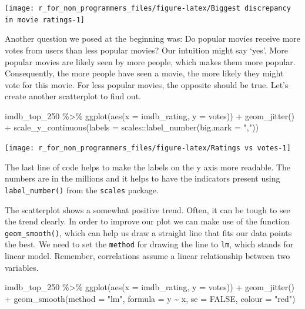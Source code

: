 \documentclass[
]{book}
\newenvironment{Shaded}{\begin{snugshade}}{\end{snugshade}}
\newcommand{\AttributeTok}[1]{\textcolor[rgb]{0.77,0.63,0.00}{#1}}
\newcommand{\ConstantTok}[1]{\textcolor[rgb]{0.00,0.00,0.00}{#1}}
\newcommand{\FunctionTok}[1]{\textcolor[rgb]{0.00,0.00,0.00}{#1}}
\newcommand{\NormalTok}[1]{#1}
\newcommand{\SpecialCharTok}[1]{\textcolor[rgb]{0.00,0.00,0.00}{#1}}
\newcommand{\StringTok}[1]{\textcolor[rgb]{0.31,0.60,0.02}{#1}}
\begin{document}
\begin{center}\texttt{[image: r\_for\_non\_programmers\_files/figure-latex/Biggest discrepancy in movie ratings-1]} \end{center}

Another question we posed at the beginning was: Do popular movies receive more votes from users than less popular movies? Our intuition might say `yes'. More popular movies are likely seen by more people, which makes them more popular. Consequently, the more people have seen a movie, the more likely they might vote for this movie. For less popular movies, the opposite should be true. Let's create another scatterplot to find out.

\begin{Shaded}
\begin{Highlighting}[]
\NormalTok{imdb\_top\_250 }\SpecialCharTok{\%\textgreater{}\%}
  \FunctionTok{ggplot}\NormalTok{(}\FunctionTok{aes}\NormalTok{(}\AttributeTok{x =}\NormalTok{ imdb\_rating, }\AttributeTok{y =}\NormalTok{ votes)) }\SpecialCharTok{+} 
  \FunctionTok{geom\_jitter}\NormalTok{() }\SpecialCharTok{+}
  \FunctionTok{scale\_y\_continuous}\NormalTok{(}\AttributeTok{labels =}\NormalTok{ scales}\SpecialCharTok{::}\FunctionTok{label\_number}\NormalTok{(}\AttributeTok{big.mark =} \StringTok{","}\NormalTok{))}
\end{Highlighting}
\end{Shaded}

\begin{center}\texttt{[image: r\_for\_non\_programmers\_files/figure-latex/Ratings vs votes-1]} \end{center}

The last line of code helps to make the labels on the y axis more readable. The numbers are in the millions and it helps to have the indicators present using \texttt{label\_number()} from the \texttt{scales} package.

The scatterplot shows a somewhat positive trend. Often, it can be tough to see the trend clearly. In order to improve our plot we can make use of the function \texttt{geom\_smooth()}, which can help us draw a straight line that fits our data points the best. We need to set the \texttt{method} for drawing the line to \texttt{lm}, which stands for linear model. Remember, correlations assume a linear relationship between two variables.

\begin{Shaded}
\begin{Highlighting}[]
\NormalTok{imdb\_top\_250 }\SpecialCharTok{\%\textgreater{}\%}
  \FunctionTok{ggplot}\NormalTok{(}\FunctionTok{aes}\NormalTok{(}\AttributeTok{x =}\NormalTok{ imdb\_rating, }\AttributeTok{y =}\NormalTok{ votes)) }\SpecialCharTok{+} 
  \FunctionTok{geom\_jitter}\NormalTok{() }\SpecialCharTok{+}
  \FunctionTok{geom\_smooth}\NormalTok{(}\AttributeTok{method =} \StringTok{"lm"}\NormalTok{,}
              \AttributeTok{formula =}\NormalTok{ y }\SpecialCharTok{\textasciitilde{}}\NormalTok{ x,}
              \AttributeTok{se =} \ConstantTok{FALSE}\NormalTok{,}
              \AttributeTok{colour =} \StringTok{"red"}\NormalTok{)}
\end{Highlighting}
\end{Shaded}
\end{document}
